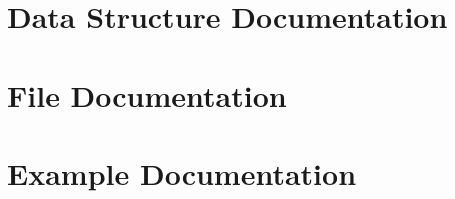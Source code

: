 \documentclass[twoside]{book}
\newcommand{\+}{\discretionary{\mbox{\scriptsize$\hookleftarrow$}}{}{}}
\newcommand{\clearemptydoublepage}{%
  \newpage{\pagestyle{empty}\cleardoublepage}%
}
\begin{document}
\chapter{Data Structure Documentation}









\chapter{File Documentation}












\chapter{Example Documentation}







\backmatter
\newpage
{}
\clearemptydoublepage
{}
\printindex
\end{document}

